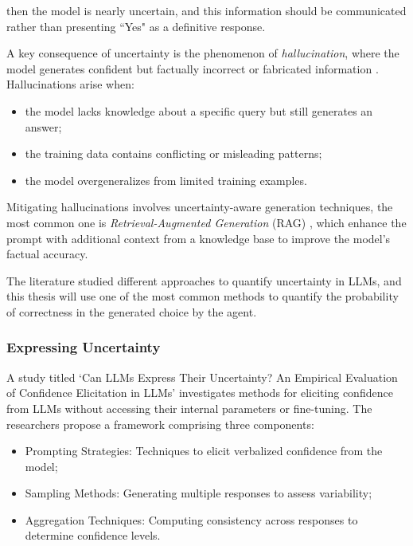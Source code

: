 then the model is nearly uncertain, and this information should be communicated
rather than presenting ``Yes" as a definitive response.

A key consequence of uncertainty is the phenomenon of \emph{hallucination}, where
the model generates confident but factually incorrect or fabricated information \cite{Ji_2023}.
Hallucinations arise when:
\begin{itemize}
  \item the model lacks knowledge about a specific query but still generates an answer;

  \item the training data contains conflicting or misleading patterns;

  \item the model overgeneralizes from limited training examples.
\end{itemize}

Mitigating hallucinations involves uncertainty-aware generation techniques, the most
common one is \emph{Retrieval-Augmented Generation} (RAG)
\cite{lewis2021retrievalaugmentedgenerationknowledgeintensivenlp}, which enhance
the prompt with additional context from a knowledge base to improve the model's factual
accuracy.

The literature studied different approaches to quantify uncertainty in LLMs, and
this thesis will use one of the most common methods to quantify the probability
of correctness in the generated choice by the agent.

\subsubsection{Expressing Uncertainty}
A study titled `Can LLMs Express Their Uncertainty? An Empirical Evaluation of
Confidence Elicitation in LLMs' \cite{xiong2024llmsexpressuncertaintyempirical} investigates
methods for eliciting confidence from LLMs without accessing their internal parameters
or fine-tuning. The researchers propose a framework comprising three components:
\begin{itemize}
  \item Prompting Strategies: Techniques to elicit verbalized confidence from
    the model;

  \item Sampling Methods: Generating multiple responses to assess variability;

  \item Aggregation Techniques: Computing consistency across responses to
    determine confidence levels.
\end{itemize}

